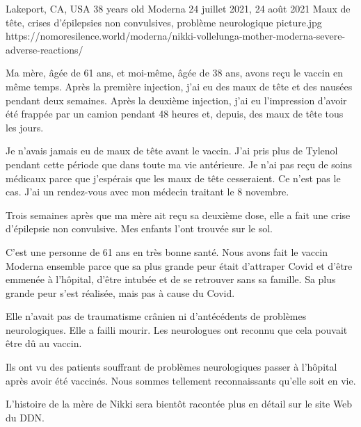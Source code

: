 {Lakeport, CA, USA}
{38 years old}
{Moderna}
{24 juillet 2021, 24 août 2021}
{Maux de tête, crises d'épilepsies non convulsives, problème neurologique}
{picture.jpg}
{https://nomoresilence.world/moderna/nikki-vollelunga-mother-moderna-severe-adverse-reactions/}
{

Ma mère, âgée de 61 ans, et moi-même, âgée de 38 ans, avons reçu le vaccin en
même temps. Après la première injection, j'ai eu des maux de tête et des nausées
pendant deux semaines. Après la deuxième injection, j'ai eu l'impression d'avoir
été frappée par un camion pendant 48 heures et, depuis, des maux de tête tous
les jours.

Je n'avais jamais eu de maux de tête avant le vaccin. J'ai pris plus de Tylenol
pendant cette période que dans toute ma vie antérieure. Je n'ai pas reçu de
soins médicaux parce que j'espérais que les maux de tête cesseraient. Ce n'est
pas le cas. J'ai un rendez-vous avec mon médecin traitant le 8 novembre.

Trois semaines après que ma mère ait reçu sa deuxième dose, elle a fait une
crise d'épilepsie non convulsive. Mes enfants l'ont trouvée sur le sol.

C'est une personne de 61 ans en très bonne santé. Nous avons fait le vaccin
Moderna ensemble parce que sa plus grande peur était d'attraper Covid et d'être
emmenée à l'hôpital, d'être intubée et de se retrouver sans sa famille. Sa plus
grande peur s'est réalisée, mais pas à cause du Covid.

Elle n'avait pas de traumatisme crânien ni d'antécédents de problèmes
neurologiques. Elle a failli mourir. Les neurologues ont reconnu que cela
pouvait être dû au vaccin.

Ils ont vu des patients souffrant de problèmes neurologiques passer à l'hôpital
après avoir été vaccinés. Nous sommes tellement reconnaissants qu'elle soit en
vie.

L'histoire de la mère de Nikki sera bientôt racontée plus en détail sur le site
Web du DDN.

}
